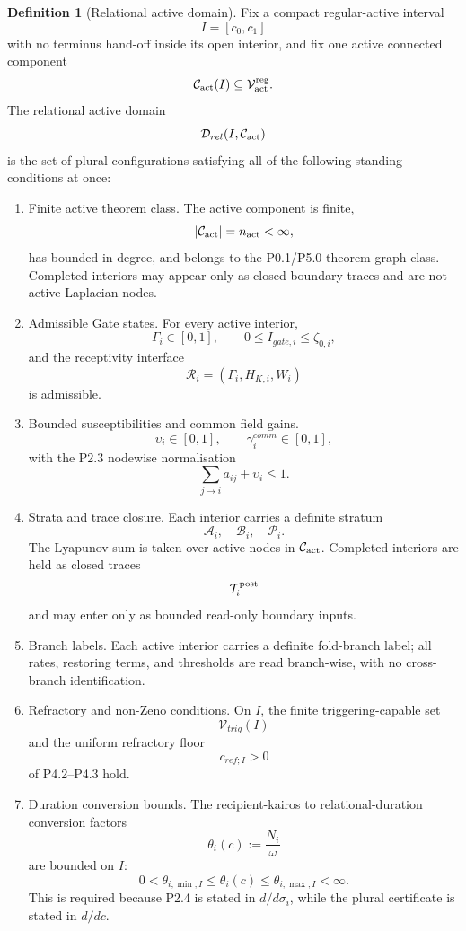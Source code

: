 \documentclass[11pt,a4paper]{article}
\def\mathfrak#1{#1}%
\def\mathrm#1{#1}%
\def\emph#1{#1}%
\theoremstyle{definition}
\newtheorem{definition}{Definition}[section]
\theoremstyle{plain}
\theoremstyle{remark}
\begin{document}
\begin{definition}[Relational active domain]\label{def:domain}
Fix a compact regular-active interval
\[
I=[\mathfrak c_0,\mathfrak c_1]
\]
with no terminus hand-off inside its open interior, and fix one active connected
component
\[
\mathcal C_{\rm act}(I)\subseteq\mathcal V_{\rm act}^{\rm reg}.
\]
The \emph{relational active domain}
\[
\mathcal D_{\mathrm{rel}}(I,\mathcal C_{\rm act})
\]
is the set of plural configurations satisfying all of the following standing
conditions at once:
\begin{enumerate}[label=\textup{(\arabic*)},leftmargin=1.2cm]
\item \emph{Finite active theorem class.}
The active component is finite,
\[
|\mathcal C_{\rm act}|=n_{\rm act}<\infty,
\]
has bounded in-degree, and belongs to the P0.1/P5.0 theorem graph class. Completed
interiors may appear only as closed boundary traces and are not active Laplacian
nodes.

\item \emph{Admissible Gate states.}
For every active interior,
\[
\Gamma_i\in[0,1],
\qquad
0\le I_{\mathrm{gate},i}\le\zeta_{0,i},
\]
and the receptivity interface
\[
\mathcal R_i=(\Gamma_i,H_{K,i},W_i)
\]
is admissible.

\item \emph{Bounded susceptibilities and common field gains.}
\[
\upsilon_i\in[0,1],
\qquad
\gamma_i^{\mathrm{comm}}\in[0,1],
\]
with the P2.3 nodewise normalisation
\[
\sum_{j\to i}a_{ij}+\upsilon_i\le1.
\]

\item \emph{Strata and trace closure.}
Each interior carries a definite stratum
\[
\mathcal A_i,\quad \mathcal B_i,\quad \mathcal P_i.
\]
The Lyapunov sum is taken over active nodes in
\(\mathcal C_{\rm act}\). Completed interiors are held as closed traces
\[
\mathcal T_i^{\rm post}
\]
and may enter only as bounded read-only boundary inputs.

\item \emph{Branch labels.}
Each active interior carries a definite fold-branch label; all rates, restoring
terms, and thresholds are read branch-wise, with no cross-branch identification.

\item \emph{Refractory and non-Zeno conditions.}
On \(I\), the finite triggering-capable set
\[
\mathcal V_{\mathrm{trig}}(I)
\]
and the uniform refractory floor
\[
\mathfrak c_{\mathrm{ref};I}>0
\]
of P4.2--P4.3 hold.

\item \emph{Duration conversion bounds.}
The recipient-kairos to relational-duration conversion factors
\[
\theta_i(\mathfrak c):=\frac{N_i}{\omega}
\]
are bounded on \(I\):
\[
0<\theta_{i,\min;I}
\le
\theta_i(\mathfrak c)
\le
\theta_{i,\max;I}<\infty.
\]
This is required because P2.4 is stated in \(d/d\sigma_i\), while the plural
certificate is stated in \(d/d\mathfrak c\).


\end{enumerate}
\end{definition}
\end{document}
